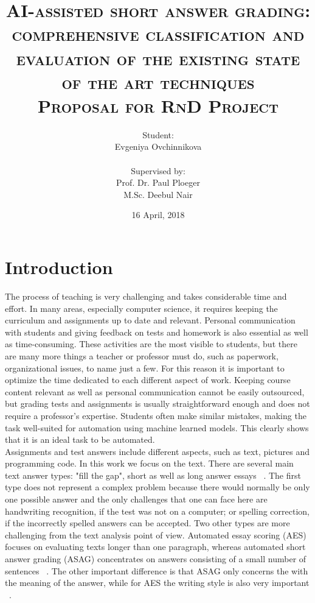 \documentclass[11pt]{report}
\title{
\normalfont \huge
\textsc{AI-assisted short answer grading: comprehensive classification and evaluation of the existing state of the art techniques \\Proposal for RnD Project
} %
}
\author{Student: \\Evgeniya Ovchinnikova\\
\\Supervised by:
\\Prof. Dr. Paul Ploeger
\\M.Sc. Deebul Nair } %
\date{\normalsize 16 April, 2018} %
\numberwithin{equation}{section} %
\begin{document}
\maketitle %
\thispagestyle{empty}
\newpage
{}
\chapter{\textbf{Introduction} }

The process of teaching is very challenging and takes considerable time and effort. In many areas, especially computer science, it requires keeping the curriculum and assignments up to date and relevant. Personal communication with students and giving feedback on tests and homework is also essential as well as time-consuming. These activities are the most visible to students, but there are many more things a teacher or professor must do, such as paperwork, organizational issues, to name just a few. For this reason it is important to optimize the time dedicated to each different aspect of work. Keeping course content relevant as well as personal communication cannot be easily outsourced, but grading tests and assignments is usually straightforward enough and does not require a professor's expertise. Students often make similar mistakes, making the task well-suited for automation using machine learned models. This clearly shows that it is an ideal task to be automated.\\

Assignments and test answers include different aspects, such as text, pictures and programming code. In this work we focus on the text. There are several main text answer types: "fill the gap", short as well as long answer essays ~\cite{Hasanah}. The first type does not represent a complex problem because there would normally be only one possible answer and the only challenges that one can face here are handwriting recognition, if the test was not on a computer; or spelling correction, if the incorrectly spelled answers can be accepted. Two other types are more challenging from the text analysis point of view. Automated essay scoring (AES) focuses on evaluating texts longer than one paragraph, whereas automated short answer grading (ASAG) concentrates on answers consisting of a small number of sentences ~\cite{Hasanah}. The other important difference is that ASAG only concerns the with the meaning of the answer, while for AES the writing style is also very important ~\cite{Burrows}. \\
\end{document}
